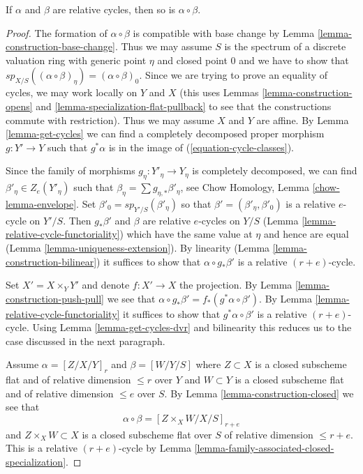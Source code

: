 \begin{lemma}
\label{lemma-well-defined}
If $\alpha$ and $\beta$ are relative cycles, then so is $\alpha \circ \beta$.
\end{lemma}

\begin{proof}
The formation of $\alpha \circ \beta$ is compatible with base change
by Lemma \ref{lemma-construction-base-change}. Thus we may assume
$S$ is the spectrum of a discrete valuation ring with generic point
$\eta$ and closed point $0$ and we have to show that
$sp_{X/S}((\alpha \circ \beta)_\eta) = (\alpha \circ \beta)_0$.
Since we are trying to prove an equality of cycles, we may
work locally on $Y$ and $X$ (this uses
Lemmas \ref{lemma-construction-opens} and
\ref{lemma-specialization-flat-pullback}
to see that the constructions commute with restriction).
Thus we may assume $X$ and $Y$ are affine.
By Lemma \ref{lemma-get-cycles}
we can find a completely decomposed proper morphism
$g : Y' \to Y$ such that $g^*\alpha$ is in the image of
(\ref{equation-cycle-classes}).

\medskip\noindent
Since the family of morphisms $g_\eta : Y'_\eta \to Y_\eta$
is completely decomposed, we can find $\beta'_\eta \in Z_e(Y'_\eta)$ such that
$\beta_\eta = \sum g_{\eta, *}\beta'_\eta$, see
Chow Homology, Lemma \ref{chow-lemma-envelope}.
Set $\beta'_0 = sp_{Y'/S}(\beta'_\eta)$ so that
$\beta' = (\beta'_\eta, \beta'_0)$ is a relative $e$-cycle on $Y'/S$. Then
$g_*\beta'$ and $\beta$ are relative $e$-cycles
on $Y/S$ (Lemma \ref{lemma-relative-cycle-functoriality})
which have the same value at $\eta$ and hence are equal
(Lemma \ref{lemma-uniqueness-extension}). By linearity
(Lemma \ref{lemma-construction-bilinear})
it suffices to show that $\alpha \circ g_*\beta'$
is a relative $(r + e)$-cycle.

\medskip\noindent
Set $X' = X \times_Y Y'$ and denote $f : X' \to X$ the projection.
By Lemma \ref{lemma-construction-push-pull} we see that
$\alpha \circ g_*\beta' = f_*(g^*\alpha \circ \beta')$.
By Lemma \ref{lemma-relative-cycle-functoriality}
it suffices to show that $g^*\alpha \circ \beta'$
is a relative $(r + e)$-cycle. Using Lemma \ref{lemma-get-cycles-dvr}
and bilinearity this reduces us to the case discussed in the next paragraph.

\medskip\noindent
Assume $\alpha = [Z/X/Y]_r$ and $\beta = [W/Y/S]$
where $Z \subset X$ is a closed subscheme flat and of relative
dimension $\leq r$ over $Y$ and $W \subset Y$ is a closed
subscheme flat and of relative dimension $\leq e$ over $S$.
By Lemma \ref{lemma-construction-closed} we see that
$$
\alpha \circ \beta = [Z \times_X W/X/S]_{r + e}
$$
and $Z \times_X W \subset X$ is a closed subscheme flat over $S$
of relative dimension $\leq r + e$. This is a relative $(r + e)$-cycle by
Lemma \ref{lemma-family-associated-closed-specialization}.
\end{proof}

